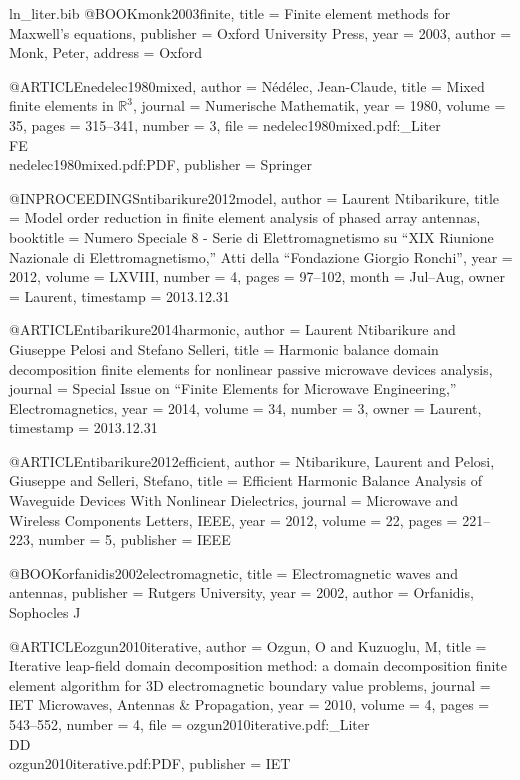 \begin{filecontents*}{ln_liter.bib}
@BOOK{monk2003finite,
  title = {Finite element methods for {M}axwell's equations},
  publisher = {Oxford University Press},
  year = {2003},
  author = {Monk, Peter},
  address = {Oxford}
}

@ARTICLE{nedelec1980mixed,
  author = {N{\'e}d{\'e}lec, Jean-Claude},
  title = {Mixed finite elements in $\mathbb{R}^3$},
  journal = {Numerische Mathematik},
  year = {1980},
  volume = {35},
  pages = {315--341},
  number = {3},
  file = {nedelec1980mixed.pdf:_Liter\\FE\\nedelec1980mixed.pdf:PDF},
  publisher = {Springer}
}

@INPROCEEDINGS{ntibarikure2012model,
  author = {Laurent Ntibarikure},
  title = {Model order reduction in finite element analysis of phased array
	antennas},
  booktitle = {Numero Speciale 8 - Serie di Elettromagnetismo su ``XIX Riunione
	Nazionale di Elettromagnetismo,'' Atti della ``Fondazione Giorgio
	Ronchi''},
  year = {2012},
  volume = {LXVIII},
  number = {4},
  pages = {97--102},
  month = {Jul--Aug},
  owner = {Laurent},
  timestamp = {2013.12.31}
}

@ARTICLE{ntibarikure2014harmonic,
  author = {Laurent Ntibarikure and Giuseppe Pelosi and Stefano Selleri},
  title = {Harmonic balance domain decomposition finite elements for nonlinear
	passive microwave devices analysis},
  journal = {Special Issue on ``Finite Elements for Microwave Engineering,'' Electromagnetics},
  year = {2014},
  volume = {34},
  number = {3},
  owner = {Laurent},
  timestamp = {2013.12.31}
}

@ARTICLE{ntibarikure2012efficient,
  author = {Ntibarikure, Laurent and Pelosi, Giuseppe and Selleri, Stefano},
  title = {Efficient Harmonic Balance Analysis of Waveguide Devices With Nonlinear
	Dielectrics},
  journal = {Microwave and Wireless Components Letters, IEEE},
  year = {2012},
  volume = {22},
  pages = {221--223},
  number = {5},
  publisher = {IEEE}
}

@BOOK{orfanidis2002electromagnetic,
  title = {Electromagnetic waves and antennas},
  publisher = {Rutgers University},
  year = {2002},
  author = {Orfanidis, Sophocles J}
}

@ARTICLE{ozgun2010iterative,
  author = {Ozgun, O and Kuzuoglu, M},
  title = {Iterative leap-field domain decomposition method: a domain decomposition
	finite element algorithm for {3D} electromagnetic boundary value
	problems},
  journal = {IET Microwaves, Antennas \& Propagation},
  year = {2010},
  volume = {4},
  pages = {543--552},
  number = {4},
  file = {ozgun2010iterative.pdf:_Liter\\DD\\ozgun2010iterative.pdf:PDF},
  publisher = {IET}
}


\end{filecontents*}

